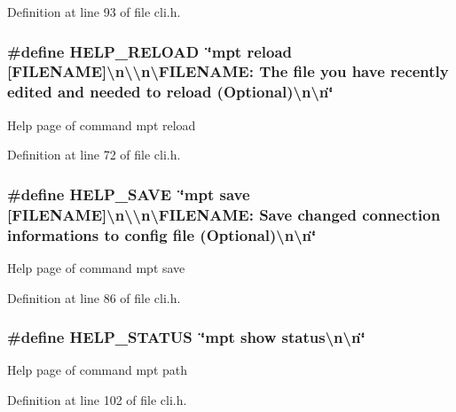 Definition at line 93 of file cli.\-h.

\hypertarget{group___mpt_help_ga17ba7938d1129e4cc183c9eb077a6bee}{
\subsubsection[{H\-E\-L\-P\-\_\-\-R\-E\-L\-O\-A\-D}]{\setlength{\rightskip}{0pt plus 5cm}\#define H\-E\-L\-P\-\_\-\-R\-E\-L\-O\-A\-D~\char`\"{}mpt reload \mbox{[}F\-I\-L\-E\-N\-A\-M\-E\mbox{]}\textbackslash{}n\textbackslash{}\textbackslash{}n\textbackslash{}\-F\-I\-L\-E\-N\-A\-M\-E\-:   The file you have recently edited and needed to reload (Optional)\textbackslash{}n\textbackslash{}n\char`\"{}}}\label{group___mpt_help_ga17ba7938d1129e4cc183c9eb077a6bee}
Help page of command mpt reload 

Definition at line 72 of file cli.\-h.

\hypertarget{group___mpt_help_ga4e200188b29b26838c155fb16c4975f6}{
\subsubsection[{H\-E\-L\-P\-\_\-\-S\-A\-V\-E}]{\setlength{\rightskip}{0pt plus 5cm}\#define H\-E\-L\-P\-\_\-\-S\-A\-V\-E~\char`\"{}mpt save \mbox{[}F\-I\-L\-E\-N\-A\-M\-E\mbox{]}\textbackslash{}n\textbackslash{}\textbackslash{}n\textbackslash{}\-F\-I\-L\-E\-N\-A\-M\-E\-:   Save changed connection informations to config file (Optional)\textbackslash{}n\textbackslash{}n\char`\"{}}}\label{group___mpt_help_ga4e200188b29b26838c155fb16c4975f6}
Help page of command mpt save 

Definition at line 86 of file cli.\-h.

\hypertarget{group___mpt_help_ga69eff6cb726be089c9475ae7428e47a0}{
\subsubsection[{H\-E\-L\-P\-\_\-\-S\-T\-A\-T\-U\-S}]{\setlength{\rightskip}{0pt plus 5cm}\#define H\-E\-L\-P\-\_\-\-S\-T\-A\-T\-U\-S~\char`\"{}mpt show status\textbackslash{}n\textbackslash{}n\char`\"{}}}\label{group___mpt_help_ga69eff6cb726be089c9475ae7428e47a0}
Help page of command mpt path 

Definition at line 102 of file cli.\-h.

